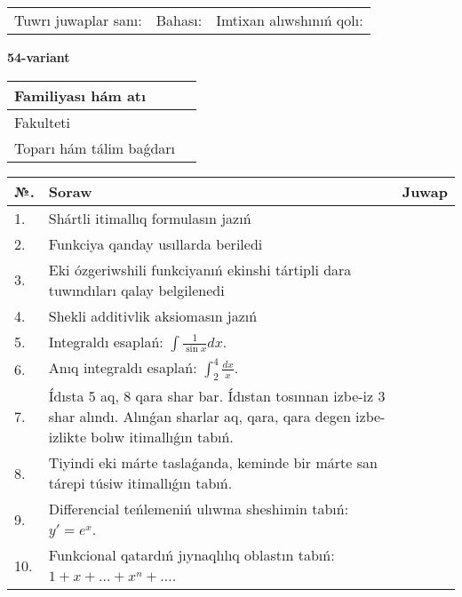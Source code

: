 \documentclass{article}
\begin{document}
\vspace{1cm}

\begin{tabular}{ c c c }
Tuwrı juwaplar sanı: \underline{\hspace{2cm}} & Bahası: \underline{\hspace{2cm}} & Imtixan alıwshınıń qolı: \underline{\hspace{2cm}} \\
\end{tabular}

\newpage

\begin{center}\textbf{54-variant}\end{center}

\bgroup
\def\arraystretch{1.5}
\begin{tabular}{ |m{6cm}|m{10cm}| }
  \hline
  Familiyası hám atı & \\
  \hline
  Fakulteti &\\
  \hline
  Toparı hám tálim baǵdarı & \\
  \hline
\end{tabular}
\egroup

\vspace{0.5cm}

\bgroup
\def\arraystretch{2}
\begin{tabular}{ |l|m{8cm}|m{7cm}| }
  \hline
  №. & Soraw & Juwap \\
  \hline
  1. & Shártli itimallıq formulasın jazıń &  \\
  \hline
  2. & Funkciya qanday usıllarda beriledi &  \\
  \hline
  3. & Eki ózgeriwshili funkciyanıń ekinshi tártipli dara tuwındıları qalay belgilenedi &  \\
  \hline
  4. & Shekli additivlik aksiomasın jazıń &  \\
  \hline
  5. & Integraldı esaplań: $\displaystyle\int {\frac{1}{\sin x}dx} $. &  \\
  \hline
  6. & Anıq integraldı esaplań: $\displaystyle\int_{2}^{4}\frac{dx}{x}$. &  \\
  \hline
  7. & Ídısta 5 aq, 8 qara shar bar. Ídıstan tosınnan izbe-iz 3 shar alındı. Alınǵan sharlar aq, qara, qara degen izbe-izlikte bolıw itimallıǵın tabıń. &  \\
  \hline
  8. & Tiyindi eki márte taslaǵanda, keminde bir márte san tárepi túsiw itimallıǵın tabıń. &  \\
  \hline
  9. & Differencial teńlemeniń ulıwma sheshimin tabıń: $y'=e^{x}$. &  \\
  \hline
  10. & Funkcional qatardıń jıynaqlılıq oblastın tabıń: $1 + x + \ldots + x^{n} + \ldots$. &  \\
  \hline
\end{tabular}
\egroup
\end{document}
